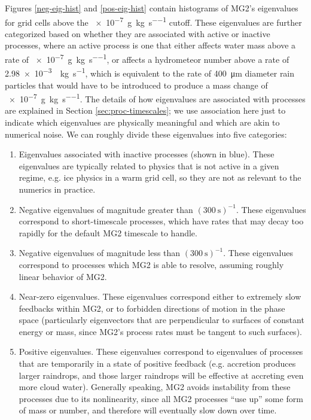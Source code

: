 \documentclass [11pt, proquest] {uwthesis}[2020/02/24]
\begin{document}
Figures \ref{neg-eig-hist} and \ref{pos-eig-hist} contain histograms of MG2's eigenvalues for grid cells above the \SI{e-7}{\gram\per\kilo\gram\per\second} cutoff. These eigenvalues are further categorized based on whether they are associated with active or inactive processes, where an active process is one that either affects water mass above a rate of \SI{e-7}{\gram\per\kilo\gram\per\second}, or affects a hydrometeor number above a rate of \SI{2.98e-3}{\per\kilo\gram\per\second}, which is equivalent to the rate of \SI{400}{\micro\meter} diameter rain particles that would have to be introduced to produce a mass change of \SI{e-7}{\gram\per\kilo\gram\per\second}. The details of how eigenvalues are associated with processes are explained in Section \ref{sec:proc-timescales}; we use association here just to indicate which eigenvalues are physically meaningful and which are akin to numerical noise. We can roughly divide these eigenvalues into five categories:

\begin{enumerate}
\item Eigenvalues associated with inactive processes (shown in blue). These eigenvalues are typically related to physics that is not active in a given regime, e.g. ice physics in a warm grid cell, so they are not as relevant to the numerics in practice.
\item Negative eigenvalues of magnitude greater than $(\SI{300}{\second})^{-1}$. These eigenvalues correspond to short-timescale processes, which have rates that may decay too rapidly for the default MG2 timescale to handle.
\item Negative eigenvalues of magnitude less than $(\SI{300}{\second})^{-1}$. These eigenvalues correspond to processes which MG2 is able to resolve, assuming roughly linear behavior of MG2.
\item Near-zero eigenvalues. These eigenvalues correspond either to extremely slow feedbacks within MG2, or to forbidden directions of motion in the phase space (particularly eigenvectors that are perpendicular to surfaces of constant energy or mass, since MG2's process rates must be tangent to such surfaces).
\item Positive eigenvalues. These eigenvalues correspond to eigenvalues of processes that are temporarily in a state of positive feedback (e.g. accretion produces larger raindrops, and those larger raindrops will be effective at accreting even more cloud water). Generally speaking, MG2 avoids instability from these processes due to its nonlinearity, since all MG2 processes ``use up'' some form of mass or number, and therefore will eventually slow down over time.
\end{enumerate}
\end{document}

